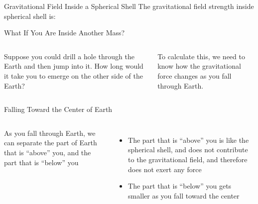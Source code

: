 \documentclass[12pt,compress,aspectratio=169]{beamer}
\begin{document}
\begin{frame}{Gravitational Field Inside a Spherical Shell}
  The gravitational field strength inside spherical shell is:
  \begin{center}
  \end{center}
\end{frame}



\begin{frame}{What If You Are Inside Another Mass?}%
  \begin{columns}


    Suppose you could drill a hole through the Earth and then jump into it. How
    long would it take you to emerge on the other side of the Earth?

    \vspace{.2in}To calculate this, we need to know how the gravitational force
    changes as you fall through Earth.
  \end{columns}
\end{frame}




\begin{frame}{Falling Toward the Center of Earth}
  \begin{columns}

    As you fall through Earth, we can separate the part of Earth that is
    ``above'' you, and the part that is ``below'' you
    \begin{itemize}
    \item The part that is ``above'' you is like the spherical shell, and does
      not contribute to the gravitational field, and therefore does not exert
      any force
    \item The part that is ``below'' you gets smaller as you fall toward the
      center
    \end{itemize}
  \end{columns}
\end{frame}
\end{document}
